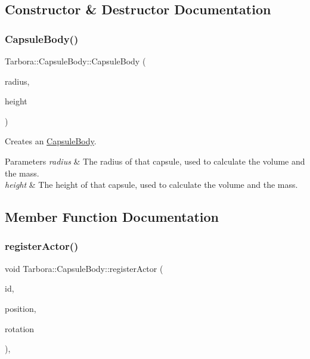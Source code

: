 \subsection{Constructor \& Destructor Documentation}
\mbox{\label{classTarbora_1_1CapsuleBody_ac7427a8fd201d1eb99944d48619e78ed}} 
\subsubsection{\texorpdfstring{Capsule\+Body()}{CapsuleBody()}}
{\footnotesize\ttfamily Tarbora\+::\+Capsule\+Body\+::\+Capsule\+Body (\begin{DoxyParamCaption}\item[{float}]{radius,  }\item[{float}]{height }\end{DoxyParamCaption})}



Creates an \hyperlink{classTarbora_1_1CapsuleBody}{Capsule\+Body}. 


\begin{DoxyParams}{Parameters}
{\em radius} & The radius of that capsule, used to calculate the volume and the mass. \\
\hline
{\em height} & The height of that capsule, used to calculate the volume and the mass. \\
\hline
\end{DoxyParams}


\subsection{Member Function Documentation}
\mbox{\label{classTarbora_1_1CapsuleBody_a4613a4f0cf0ab92189169d6f3865274e}} 
\subsubsection{\texorpdfstring{register\+Actor()}{registerActor()}}
{\footnotesize\ttfamily void Tarbora\+::\+Capsule\+Body\+::register\+Actor (\begin{DoxyParamCaption}\item[{Actor\+Id \&}]{id,  }\item[{const glm\+::vec3 \&}]{position,  }\item[{const glm\+::quat \&}]{rotation }\end{DoxyParamCaption})\hspace{0.3cm}{\ttfamily [override]}, {\ttfamily [virtual]}}



